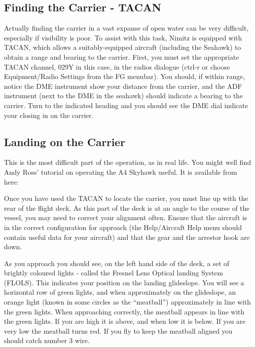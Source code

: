 \subsection{Finding the Carrier - TACAN}

Actually finding the carrier in a vast expanse of open water can be very difficult, especially if visibility
is poor. To assist with this task, Nimitz is equipped with TACAN, which allows a suitably-equipped
aircraft (including the Seahawk) to obtain a range and bearing to the carrier. First, you must set
the appropriate TACAN channel, 029Y in this case, in the radios dialogue (ctrl-r or choose
Equipment/Radio Settings from the FG menubar). You should, if within range, notice the DME instrument
show your distance from the carrier, and the ADF instrument (next to the DME in the seahawk) should
indicate a bearing to the carrier. Turn to the indicated heading and you should see the DME dial
indicate your closing in on the carrier.

\subsection{Landing on the Carrier}

This is the most difficult part of the operation, as in real life. You might well find Andy Ross' tutorial on
operating the A4 Skyhawk useful. It is available from here:

\noindent
{}

Once you have used the TACAN to locate the carrier, you must
line up with the rear of the flight deck. As this part of the deck is at an angle to the course of the vessel,
you may need to correct your alignment often. Ensure that the aircraft is in the correct configuration for
approach (the Help/Aircraft Help menu should contain useful data for your aircraft) and that the gear and
the arrestor hook are down.

As you approach you should see, on the left hand side of the deck, a set of brightly coloured lights - called
the Fresnel Lens Optical landing System (FLOLS). This indicates your position on the landing glideslope.
You will see a horizontal row of green lights, and when approximately on the glideslope, an orange light
(known in some circles as the ``meatball'') approximately in line with the green lights. When approaching
correctly, the meatball appears in line with the green lights. If you are high it is above, and when low
it is below. If you are very low the meatball turns red. If you fly to keep the meatball aligned you
should catch number 3 wire.

